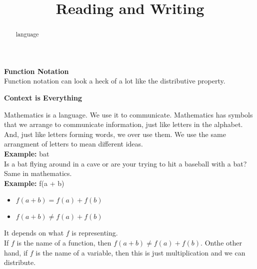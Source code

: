 \documentclass{ximera}
\title{Reading and Writing}
\begin{document}
\begin{abstract}
language
\end{abstract}
\maketitle





\begin{warning} \textbf{\textcolor{red!80!black}{Function Notation}}  \\


Function notation can look a heck of a lot like the distributive property. \\


\begin{center}

\textbf{\textcolor{purple!85!blue}{Context is Everything}}

\end{center}


Mathematics is a language.  We use it to communicate.  Mathematics has symbols that we arrange to communicate information, just like letters in the alphabet. \\

And, just like letters forming words, we over use them.  We use the same arrangment of letters to mean different ideas. \\

\textbf{Example:} bat \\

Is a bat flying around in a cave or are your trying to hit a baseball with a bat? \\


Same in mathematics.\\



\textbf{Example:} f(a + b) \\

\begin{itemize}
	\item $f(a + b) = f(a) + f(b)$
	\item $f(a + b) \ne f(a) + f(b)$
\end{itemize}


It depends on what $f$ is representing. \\

If $f$ is the name of a function, then $f(a + b) \ne f(a) + f(b)$.  Onthe other hand, if $f$ is the name of a variable, then this is just multiplication and we can distribute.



\end{warning}
\end{document}
